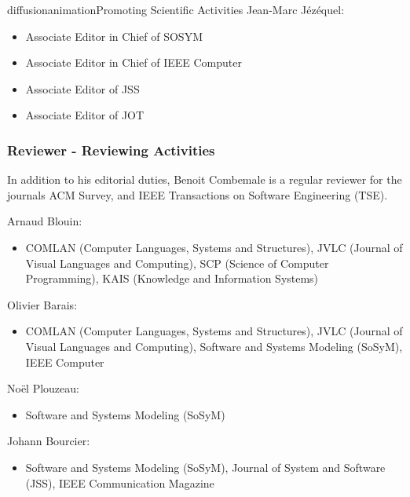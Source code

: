 \documentclass{ra2018}
\begin{document}
\begin{module}{diffusion}{animation}{Promoting Scientific Activities}
    Jean-Marc J\'ez\'equel:
    \begin{itemize}
    	\item Associate Editor in Chief of SOSYM
    	\item Associate Editor in Chief of IEEE Computer
    	\item Associate Editor of JSS
    	\item Associate Editor of JOT
    \end{itemize}
    
    \subsubsection{Reviewer - Reviewing Activities}
    
In addition to his editorial duties, Benoit Combemale is a regular reviewer for the journals ACM Survey, and IEEE Transactions on Software Engineering (TSE).


Arnaud Blouin:
\begin{itemize}
    \item COMLAN (Computer Languages, Systems and Structures), JVLC (Journal of Visual Languages and Computing), SCP (Science of Computer Programming), KAIS (Knowledge and Information Systems)
\end{itemize} 

Olivier Barais:
\begin{itemize}
	\item COMLAN (Computer Languages, Systems and Structures), JVLC (Journal of Visual Languages and Computing),  Software and Systems Modeling (SoSyM), IEEE Computer
\end{itemize} 

No\"el Plouzeau:
\begin{itemize}
	\item  Software and Systems Modeling (SoSyM)
\end{itemize} 

Johann Bourcier:
\begin{itemize}
	\item Software and Systems Modeling (SoSyM), Journal of System and Software (JSS), IEEE Communication Magazine
\end{itemize}
 
 
     
     
    

\end{module}
\end{document}
